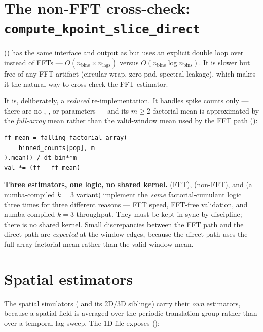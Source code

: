\section{The non-FFT cross-check: \texttt{compute\_kpoint\_slice\_direct}}

 () has the
same interface and output as  but uses an explicit
double loop over  instead of FFTs --- $O(n_{\mathrm{bins}}
\times n_{\mathrm{lags}})$ versus $O(n_{\mathrm{bins}}\log n_{\mathrm{bins}})$. It is
slower but free of any FFT artifact (circular wrap, zero-pad, spectral leakage),
which makes it the natural way to cross-check the FFT estimator.

It is, deliberately, a \emph{reduced} re-implementation. It handles spike counts
only --- there are no , , or
 parameters --- and its $m \ge 2$ factorial mean is
approximated by the \emph{full-array} mean rather than the valid-window mean used
by the FFT path ():

\begin{lstlisting}
ff_mean = falling_factorial_array(
    binned_counts[pop], m
).mean() / dt_bin**m
val *= (ff - ff_mean)
\end{lstlisting}

\begin{gotcha}
\textbf{Three estimators, one logic, no shared kernel.}
 (FFT),  (non-FFT),
and  (a numba-compiled
$k=3$ variant) implement the \emph{same} factorial-cumulant logic three times for
three different reasons --- FFT speed, FFT-free validation, and numba-compiled $k=3$
throughput. They must be kept in sync by discipline; there is no shared kernel.
Small discrepancies between the FFT path and the direct path are \emph{expected} at
the window edges, because the direct path uses the full-array factorial mean rather
than the valid-window mean.
\end{gotcha}

\section{Spatial estimators}

The spatial simulators ( and its 2D/3D siblings)
carry their \emph{own} estimators, because a spatial field is averaged over the
periodic translation group rather than over a temporal lag sweep. The 1D file
exposes ():

